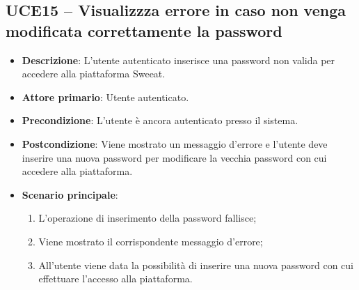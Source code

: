 \subsection{UCE15 – Visualizzza errore in caso non venga modificata correttamente la password}
\begin{itemize}
\item \textbf{Descrizione}: L'utente autenticato inserisce una password non valida per accedere alla piattaforma Sweeat.
\item \textbf{Attore primario}: Utente autenticato.
\item \textbf{Precondizione}: L'utente è ancora autenticato presso il sistema.
\item \textbf{Postcondizione}: Viene mostrato un messaggio d'errore e l'utente deve inserire una nuova password per modificare la vecchia password con cui accedere alla piattaforma.

\item \textbf{Scenario principale}:
\begin{enumerate}
\item L'operazione di inserimento della password fallisce;
\item Viene mostrato il corrispondente messaggio d'errore;
\item All'utente viene data la possibilità di inserire una nuova password con cui effettuare l'accesso alla piattaforma.
\end{enumerate}
\end{itemize}